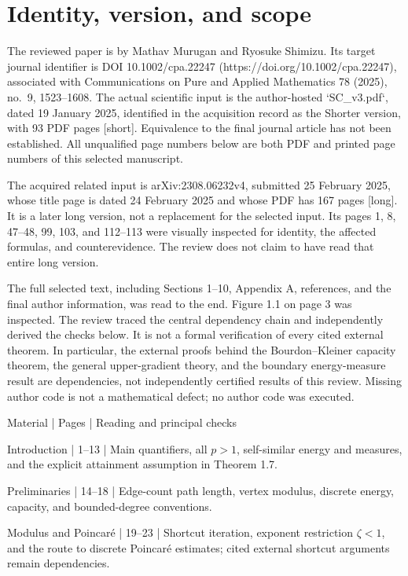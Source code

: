 \documentclass[10pt]{article}
\begin{document}
\section*{Identity, version, and scope}
The reviewed paper is by Mathav Murugan and Ryosuke Shimizu. Its target journal identifier is DOI 10.1002/cpa.22247 (https://doi.org/10.1002/cpa.22247), associated with Communications on Pure and Applied Mathematics 78 (2025), no. 9, 1523–1608. The actual scientific input is the author-hosted `SC\_v3.pdf`, dated 19 January 2025, identified in the acquisition record as the Shorter version, with 93 PDF pages [short]. Equivalence to the final journal article has not been established. All unqualified page numbers below are both PDF and printed page numbers of this selected manuscript.\par
The acquired related input is arXiv:2308.06232v4, submitted 25 February 2025, whose title page is dated 24 February 2025 and whose PDF has 167 pages [long]. It is a later long version, not a replacement for the selected input. Its pages 1, 8, 47–48, 99, 103, and 112–113 were visually inspected for identity, the affected formulas, and counterevidence. The review does not claim to have read that entire long version.\par
The full selected text, including Sections 1–10, Appendix A, references, and the final author information, was read to the end. Figure 1.1 on page 3 was inspected. The review traced the central dependency chain and independently derived the checks below. It is not a formal verification of every cited external theorem. In particular, the external proofs behind the Bourdon–Kleiner capacity theorem, the general upper-gradient theory, and the boundary energy-measure result are dependencies, not independently certified results of this review. Missing author code is not a mathematical defect; no author code was executed.\par
Material | Pages | Reading and principal checks\par
Introduction | 1–13 | Main quantifiers, all \(p>1\), self-similar energy and measures, and the explicit attainment assumption in Theorem 1.7.\par
Preliminaries | 14–18 | Edge-count path length, vertex modulus, discrete energy, capacity, and bounded-degree conventions.\par
Modulus and Poincaré | 19–23 | Shortcut iteration, exponent restriction \(\zeta<1\), and the route to discrete Poincaré estimates; cited external shortcut arguments remain dependencies.\par
\end{document}
